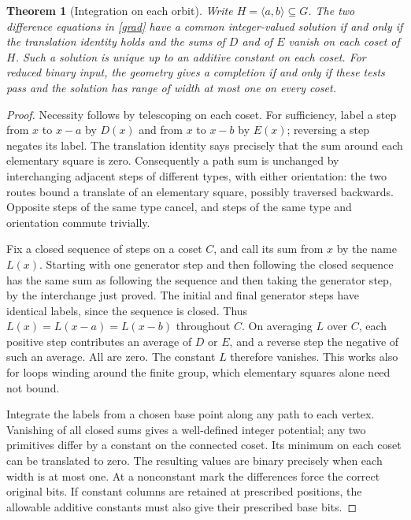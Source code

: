 \documentclass[11pt]{article}
\newtheorem{theorem}{Theorem}[section]
\begin{document}
\begin{theorem}[Integration on each orbit]\label{int}
Write $H=\langle a,b\rangle\subseteq G$. The two difference equations in \eqref{grad} have a common \emph{integer}-valued solution if and only if the translation identity holds and the sums of $D$ and of $E$ vanish on each coset of $H$. Such a solution is unique up to an additive constant on each coset. For reduced binary input, the geometry gives a completion if and only if these tests pass and the solution has range of width at most one on every coset.
\end{theorem}
\begin{proof}
Necessity follows by telescoping on each coset. For sufficiency, label a step from $x$ to $x-a$ by $D(x)$ and from $x$ to $x-b$ by $E(x)$; reversing a step negates its label. The translation identity says precisely that the sum around each elementary square is zero. Consequently a path sum is unchanged by interchanging adjacent steps of different types, with either orientation: the two routes bound a translate of an elementary square, possibly traversed backwards. Opposite steps of the same type cancel, and steps of the same type and orientation commute trivially.

Fix a closed sequence of steps on a coset $C$, and call its sum from $x$ by the name $L(x)$. Starting with one generator step and then following the closed sequence has the same sum as following the sequence and then taking the generator step, by the interchange just proved. The initial and final generator steps have identical labels, since the sequence is closed. Thus $L(x)=L(x-a)=L(x-b)$ throughout $C$. On averaging $L$ over $C$, each positive step contributes an average of $D$ or $E$, and a reverse step the negative of such an average. All are zero. The constant $L$ therefore vanishes. This works also for loops winding around the finite group, which elementary squares alone need not bound.

Integrate the labels from a chosen base point along any path to each vertex. Vanishing of all closed sums gives a well-defined integer potential; any two primitives differ by a constant on the connected coset. Its minimum on each coset can be translated to zero. The resulting values are binary precisely when each width is at most one. At a nonconstant mark the differences force the correct original bits. If constant columns are retained at prescribed positions, the allowable additive constants must also give their prescribed base bits.
\end{proof}
\end{document}
